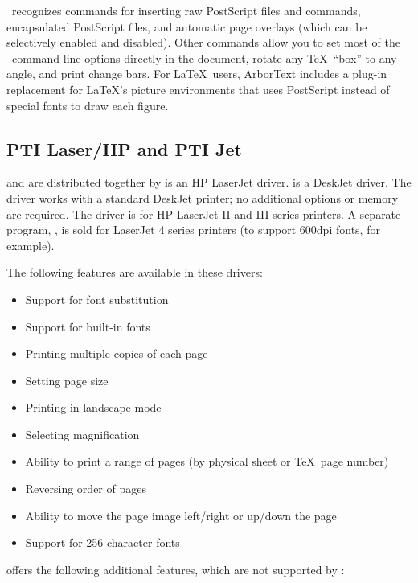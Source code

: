 \dvilaserps\ recognizes  commands for inserting raw
PostScript files and commands, encapsulated PostScript files, and
automatic page overlays (which can be selectively enabled and
disabled).  Other  commands allow you to set most
of the \dvilaserps\ command-line options directly in the document,
rotate any \TeX\ ``box'' to any angle, and print change
bars.  For \LaTeX\ users, ArborText includes a plug-in replacement
for \LaTeX's picture environments that uses PostScript instead of
special fonts to draw each figure.

\newpage
\subsection{PTI Laser/HP and PTI Jet}

 and  are 
distributed together
by    is an HP LaserJet driver.
 is a DeskJet driver.  The  driver works
with a standard DeskJet printer; no additional options or memory are
required.  The  driver is for HP LaserJet II and III
series printers.  A separate program, , is sold
for LaserJet 4 series printers (to support 600dpi fonts, for example).

The following features are available in these drivers:

\begin{itemize}
  \item Support for font substitution
  \item Support for built-in fonts
  \item Printing multiple copies of each page
  \item Setting page size
  \item Printing in landscape mode
  \item Selecting magnification
  \item Ability to print a range of pages 
        (by physical sheet or \TeX\ page number)
  \item Reversing order of pages
  \item Ability to move the page image left/right or up/down the page
  \item Support for 256 character fonts
\end{itemize}

 offers the following additional features,
which are not supported by :

